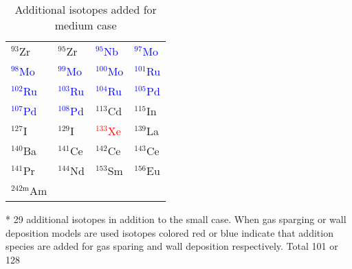 \begin{table}[htbp]
    \caption{\label{tab:medium_nuclides} Additional isotopes added for medium case}
    \centering
    \begin{threeparttable}
    \begin{tabular}{C{3cm}C{3cm}C{3cm}C{3cm}}
    \hline
    ${}^{93}$Zr & ${}^{95}$Zr & \textcolor{blue}{${}^{95}$Nb} & \textcolor{blue}{${}^{97}$Mo} \\
    \textcolor{blue}{${}^{98}$Mo} & \textcolor{blue}{${}^{99}$Mo} & \textcolor{blue}{${}^{100}$Mo} & \textcolor{blue}{${}^{101}$Ru} \\
    \textcolor{blue}{${}^{102}$Ru} & \textcolor{blue}{${}^{103}$Ru} & \textcolor{blue}{${}^{104}$Ru} & \textcolor{blue}{${}^{105}$Pd} \\
    \textcolor{blue}{${}^{107}$Pd} & \textcolor{blue}{${}^{108}$Pd} & ${}^{113}$Cd & ${}^{115}$In \\
    ${}^{127}$I & ${}^{129}$I & \textcolor{red}{${}^{133}$Xe} & ${}^{139}$La \\
    ${}^{140}$Ba & ${}^{141}$Ce & ${}^{142}$Ce & ${}^{143}$Ce \\
    ${}^{141}$Pr & ${}^{144}$Nd & ${}^{153}$Sm & ${}^{156}$Eu \\
    ${}^{242\text{m}}$Am & ${}^{}$ & ${}^{}$ & ${}^{}$ \\
    \hline
    \end{tabular}
    \begin{tablenotes}\footnotesize
    \item[*] 29 additional isotopes in addition to the small case. When gas sparging or wall deposition models are used isotopes colored red or blue indicate that addition species are added for gas sparing and wall deposition respectively. Total 101 or 128
    
   \end{tablenotes}
   \end{threeparttable}
\end{table}
